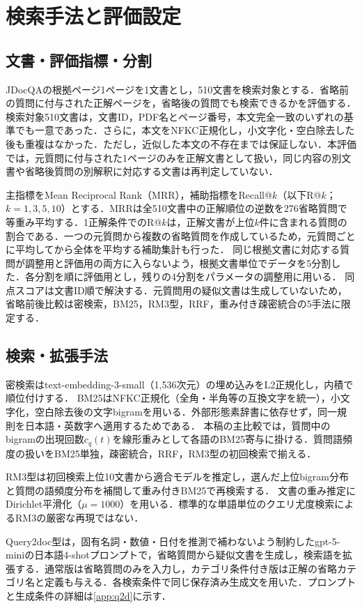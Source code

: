 \documentclass[twocolumn,a4paper,10pt]{ltjsarticle}
\begin{document}
\section{検索手法と評価設定}
\subsection{文書・評価指標・分割}
JDocQAの根拠ページ1ページを1文書とし，510文書を検索対象とする．省略前の質問に付与された正解ページを，省略後の質問でも検索できるかを評価する．検索対象510文書は，文書ID，PDF名とページ番号，本文完全一致のいずれの基準でも一意であった．さらに，本文をNFKC正規化し，小文字化・空白除去した後も重複はなかった．ただし，近似した本文の不存在までは保証しない．本評価では，元質問に付与された1ページのみを正解文書として扱い，同じ内容の別文書や省略後質問の別解釈に対応する文書は再判定していない．

主指標をMean Reciprocal Rank（MRR），補助指標をRecall@$k$（以下R@$k$；$k=1,3,5,10$）とする．MRRは全510文書中の正解順位の逆数を276省略質問で等重み平均する．1正解条件でのR@$k$は，正解文書が上位$k$件に含まれる質問の割合である．一つの元質問から複数の省略質問を作成しているため，元質問ごとに平均してから全体を平均する補助集計も行った．
同じ根拠文書に対応する質問が調整用と評価用の両方に入らないよう，根拠文書単位でデータを5分割した．各分割を順に評価用とし，残りの4分割をパラメータの調整用に用いる．
同点スコアは文書ID順で解決する．元質問用の疑似文書は生成していないため，省略前後比較は密検索，BM25，RM3型，RRF，重み付き疎密統合の5手法に限定する．

\subsection{検索・拡張手法}
密検索はtext-embedding-3-small（1,536次元）の埋め込みをL2正規化し，内積で順位付けする．
BM25はNFKC正規化（全角・半角等の互換文字を統一），小文字化，空白除去後の文字bigramを用いる．外部形態素辞書に依存せず，同一規則を日本語・英数字へ適用するためである．
本稿の主比較では，質問中のbigramの出現回数$c_q(t)$を線形重みとして各語のBM25寄与に掛ける．質問語頻度の扱いをBM25単独，疎密統合，RRF，RM3型の初回検索で揃える．

RM3型は初回検索上位10文書から適合モデル\cite{lavrenko2001relevance,jaleel2004rm3}を推定し，選んだ上位bigram分布と質問の語頻度分布を補間して重み付きBM25で再検索する．
文書の重み推定にDirichlet平滑化（$\mu=1000$）を用いる．標準的な単語単位のクエリ尤度検索によるRM3の厳密な再現ではない．

Query2doc型は，固有名詞・数値・日付を推測で補わないよう制約したgpt-5-miniの日本語4-shotプロンプトで，省略質問から疑似文書を生成し，検索語を拡張する．通常版は省略質問のみを入力し，カテゴリ条件付き版は正解の省略カテゴリ名と定義も与える．各検索条件で同じ保存済み生成文を用いた．プロンプトと生成条件の詳細は\ref{app:q2d}に示す．
\end{document}
